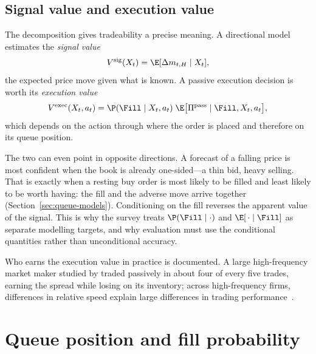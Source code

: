 \subsection{Signal value and execution value}
\label{sec:tradeability-framework}

The decomposition gives tradeability a precise meaning. A directional model estimates the
\emph{signal value}
\begin{equation}
  V^{\text{sig}}(X_t) = \E[\Delta m_{t,H} \mid X_t],
\end{equation}
the expected price move given what is known. A passive execution decision is worth its
\emph{execution value}
\begin{equation}
  V^{\text{exec}}(X_t, a_t) = \P(\Fill \mid X_t, a_t)\; \E\big[\Pi^{\text{pass}} \mid \Fill, X_t, a_t\big],
\end{equation}
which depends on the action through where the order is placed and therefore on its queue position.

The two can even point in opposite directions. A forecast of a falling price is most confident when
the book is already one-sided---a thin bid, heavy selling. That is exactly when a resting buy order is
most likely to be filled and least likely to be worth having: the fill and the adverse move arrive
together (Section~\ref{sec:queue-models}). Conditioning on the fill reverses the apparent value of the
signal. This is why the survey treats $\P(\Fill \mid \cdot)$ and $\E[\,\cdot \mid \Fill]$ as separate
modelling targets, and why evaluation must use the conditional quantities rather than unconditional
accuracy.

Who earns the execution value in practice is documented. A large high-frequency market maker studied
by \citet{menkveld2013} traded passively in about four of every five trades, earning the spread while
losing on its inventory; across high-frequency firms, differences in relative speed explain large
differences in trading performance~\citep{baron2019}.

\section{Queue position and fill probability}
\label{sec:queue-position}

